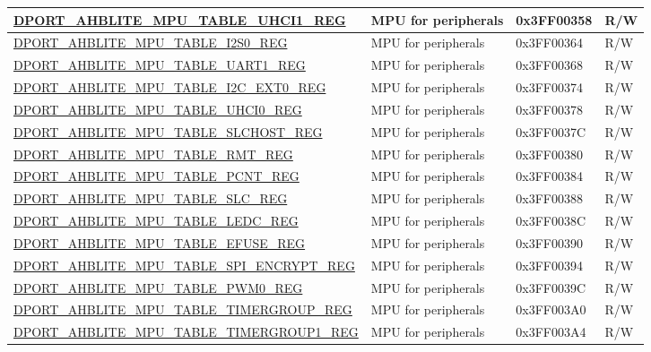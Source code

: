 \begin{longtable}{ |L{8.2cm} | L{4.5cm} | l | l | }
\hyperref[regdesc:AHBLITEMPUTABLEUHCI1REG]{DPORT\_AHBLITE\_MPU\_TABLE\_UHCI1\_REG} & MPU for peripherals & 0x3FF00358 & R/W \\ \hline
\hyperref[regdesc:AHBLITEMPUTABLEI2S0REG]{DPORT\_AHBLITE\_MPU\_TABLE\_I2S0\_REG} & MPU for peripherals & 0x3FF00364 & R/W \\ \hline
\hyperref[regdesc:AHBLITEMPUTABLEUART1REG]{DPORT\_AHBLITE\_MPU\_TABLE\_UART1\_REG} & MPU for peripherals & 0x3FF00368 & R/W \\ \hline
\hyperref[regdesc:AHBLITEMPUTABLEI2CEXT0REG]{DPORT\_AHBLITE\_MPU\_TABLE\_I2C\_EXT0\_REG} & MPU for peripherals & 0x3FF00374 & R/W \\ \hline
\hyperref[regdesc:AHBLITEMPUTABLEUHCI0REG]{DPORT\_AHBLITE\_MPU\_TABLE\_UHCI0\_REG} & MPU for peripherals & 0x3FF00378 & R/W \\ \hline
\hyperref[regdesc:AHBLITEMPUTABLESLCHOSTREG]{DPORT\_AHBLITE\_MPU\_TABLE\_SLCHOST\_REG} & MPU for peripherals & 0x3FF0037C & R/W \\ \hline
\hyperref[regdesc:AHBLITEMPUTABLERMTREG]{DPORT\_AHBLITE\_MPU\_TABLE\_RMT\_REG} & MPU for peripherals & 0x3FF00380 & R/W \\ \hline
\hyperref[regdesc:AHBLITEMPUTABLEPCNTREG]{DPORT\_AHBLITE\_MPU\_TABLE\_PCNT\_REG} & MPU for peripherals & 0x3FF00384 & R/W \\ \hline
\hyperref[regdesc:AHBLITEMPUTABLESLCREG]{DPORT\_AHBLITE\_MPU\_TABLE\_SLC\_REG} & MPU for peripherals & 0x3FF00388 & R/W \\ \hline
\hyperref[regdesc:AHBLITEMPUTABLELEDCREG]{DPORT\_AHBLITE\_MPU\_TABLE\_LEDC\_REG} & MPU for peripherals & 0x3FF0038C & R/W \\ \hline
\hyperref[regdesc:AHBLITEMPUTABLEEFUSEREG]{DPORT\_AHBLITE\_MPU\_TABLE\_EFUSE\_REG} & MPU for peripherals & 0x3FF00390 & R/W \\ \hline
\hyperref[regdesc:AHBLITEMPUTABLESPIENCRYPTREG]{DPORT\_AHBLITE\_MPU\_TABLE\_SPI\_ENCRYPT\_REG} & MPU for peripherals & 0x3FF00394 & R/W \\ \hline
\hyperref[regdesc:AHBLITEMPUTABLEPWM0REG]{DPORT\_AHBLITE\_MPU\_TABLE\_PWM0\_REG} & MPU for peripherals & 0x3FF0039C & R/W \\ \hline
\hyperref[regdesc:AHBLITEMPUTABLETIMERGROUPREG]{DPORT\_AHBLITE\_MPU\_TABLE\_TIMERGROUP\_REG} & MPU for peripherals & 0x3FF003A0 & R/W \\ \hline
\hyperref[regdesc:AHBLITEMPUTABLETIMERGROUP1REG]{DPORT\_AHBLITE\_MPU\_TABLE\_TIMERGROUP1\_REG} & MPU for peripherals & 0x3FF003A4 & R/W \\ \hline

\end{longtable}
